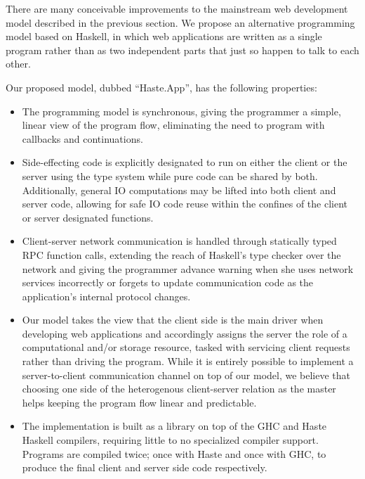 \documentclass[preprint]{sigplanconf}
\begin{document}
There are many conceivable improvements to the mainstream web development model
described in the previous section. We propose an alternative programming model
based on Haskell, in which web applications are written as a single program
rather than as two independent parts that just so happen to talk to each other.

Our proposed model, dubbed ``Haste.App'', has the following properties:

\begin{itemize}
  \item The programming model is synchronous, giving the programmer a simple,
        linear view of the program flow, eliminating the need to program with
        callbacks and continuations.
  \item Side-effecting code is explicitly designated to run on either the
        client or the server using the type system while pure code can be
        shared by both. Additionally, general IO computations may be lifted
        into both client and server code, allowing for safe IO code reuse
        within the confines of the client or server designated functions.
  \item Client-server network communication is handled through statically typed
        RPC function calls, extending the reach of Haskell's type checker over
        the network and giving the programmer advance warning when she uses
        network services incorrectly or forgets to update communication code
        as the application's internal protocol changes.
  \item Our model takes the view that the client side is the main driver when
        developing web applications and accordingly assigns the server
        the role of a computational and/or storage resource, tasked with
        servicing client requests rather than driving the program. While it is
        entirely possible to implement a server-to-client communication channel
        on top of our model, we believe that choosing one side of the
        heterogenous client-server relation as the master helps keeping the
        program flow linear and predictable.
  \item The implementation is built as a library on top of the GHC and Haste
        Haskell compilers, requiring little to no specialized compiler support.
        Programs are compiled twice; once with Haste and once with GHC, to
        produce the final client and server side code respectively.
\end{itemize}
\end{document}
